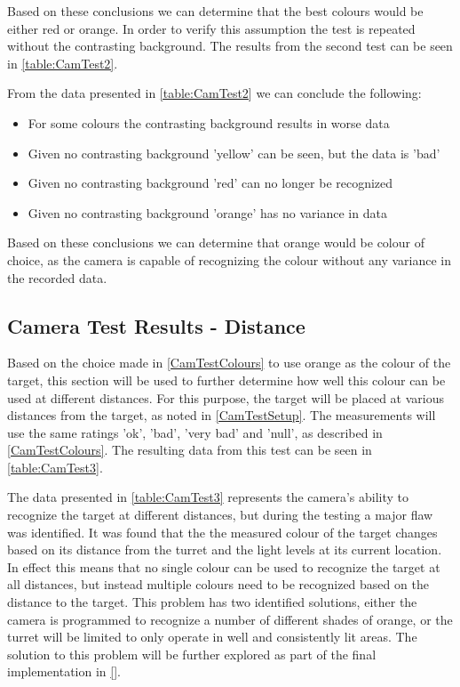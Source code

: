Based on these conclusions we can determine that the best colours would be
either red or orange. In order to verify this assumption the test is repeated
without the contrasting background. The results from the second test can be seen
in \autoref{table:CamTest2}.


From the data presented in \autoref{table:CamTest2} we can conclude the
following:
\begin{itemize}
  \item For some colours the contrasting background results in worse data
  \item Given no contrasting background 'yellow' can be seen, but the data is
  'bad'
  \item Given no contrasting background 'red' can no longer be recognized
  \item Given no contrasting background 'orange' has no variance in data
\end{itemize}

Based on these conclusions we can determine that orange would be colour of
choice, as the camera is capable of recognizing the colour without any variance
in the recorded data.

\subsection{Camera Test Results - Distance}\label{CamTestDistance}
Based on the choice made in \autoref{CamTestColours} to use orange as the colour
of the target, this section will be used to further determine how well this
colour can be used at different distances. For this purpose, the target will be
placed at various distances from the target, as noted in \autoref{CamTestSetup}.
The measurements will use the same ratings 'ok', 'bad', 'very bad' and 'null',
as described in \autoref{CamTestColours}. The resulting data from this test can be
seen in \autoref{table:CamTest3}.


The data presented in \autoref{table:CamTest3} represents the camera's ability
to recognize the target at different distances, but during the testing a major
flaw was identified. It was found that the the measured colour of the target
changes based on its distance from the turret and the light levels at its
current location. In effect this means that no single colour can be used to
recognize the target at all distances, but instead multiple colours need to be
recognized based on the distance to the target. This problem has two identified
solutions, either the camera is programmed to recognize a number of different
shades of orange, or the turret will be limited to only operate in well and
consistently lit areas. The solution to this problem will be further explored
as part of the final implementation in \autoref{}.

